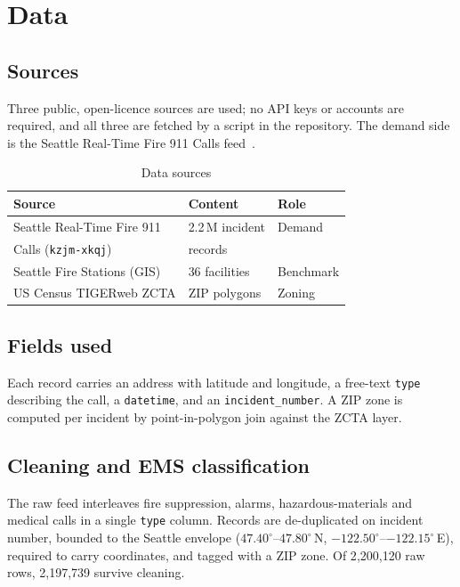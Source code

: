 \documentclass[conference]{IEEEtran}
\begin{document}
\section{Data}

\subsection{Sources}

Three public, open-licence sources are used; no API keys or accounts are
required, and all three are fetched by a script in the repository. The demand
side is the Seattle Real-Time Fire 911 Calls feed~\cite{seattledata}.

\begin{table}[htbp]
\caption{Data sources}
\label{tab:sources}
\centering
\small
\begin{tabular}{@{}lll@{}}
\toprule
\textbf{Source} & \textbf{Content} & \textbf{Role} \\
\midrule
Seattle Real-Time Fire 911 & 2.2\,M incident & Demand \\
Calls (\texttt{kzjm-xkqj}) & records & \\
Seattle Fire Stations (GIS) & 36 facilities & Benchmark \\
US Census TIGERweb ZCTA & ZIP polygons & Zoning \\
\bottomrule
\end{tabular}
\end{table}

\subsection{Fields used}

Each record carries an address with latitude and longitude, a free-text
\texttt{type} describing the call, a \texttt{datetime}, and an
\texttt{incident\_number}. A ZIP zone is computed per incident by
point-in-polygon join against the ZCTA layer.

\subsection{Cleaning and EMS classification}

The raw feed interleaves fire suppression, alarms, hazardous-materials and
medical calls in a single \texttt{type} column. Records are de-duplicated on
incident number, bounded to the Seattle envelope
($47.40^\circ$--$47.80^\circ$\,N, $-122.50^\circ$--$-122.15^\circ$\,E), required
to carry coordinates, and tagged with a ZIP zone. Of 2{,}200{,}120 raw rows,
2{,}197{,}739 survive cleaning.
\end{document}
